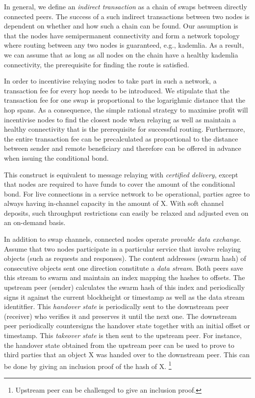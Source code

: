 \documentclass[a4paper,10pt]{article}
\newcommand\gloss[1]{\emph{\gls{#1}}}
\begin{document}
In general, we define an \emph{indirect transaction} as a chain of swaps between directly connected
peers. The success of a such indirect transactions between two nodes is dependent on whether and
how such a chain can be found. Our assumption is that the nodes have semipermanent connectivity
and form a network topology where routing between any two nodes is guaranteed, e.g., kademlia. As a result, we can assume that as long as all nodes on the chain have a healthy kademlia connectivity, the prerequisite for finding the route is satisfied.

In order to incentivise relaying nodes to take part in such a network,
a transaction fee for every hop needs to be introduced.  We stipulate that the transaction fee
for one swap is proportional to the logarighmic distance that the hop spans.
As a consequence, the simple rational strategy to maximise profit will incentivise nodes to find the
closest node when relaying as well as maintain a healthy connectivity that is the
prerequisite for successful routing.
Furthermore, the entire transaction fee can be precalculated as proportional
to the distance between sender and remote beneficiary and therefore can be offered in advance
when issuing the conditional bond.

This construct is
equivalent to message relaying with \gloss{certified delivery}, except that nodes are required to have
funds to cover the amount of the conditional bond.
For live connections in a service network to be operational,
parties agree to always having in-channel capacity in the amount of X.
With soft channel deposits, such throughput restrictions can easily
be relaxed and adjusted even on an on-demand basis.

In addition to swap channels, connected nodes operate \gloss{provable data exchange}.
Assume that two nodes participate in a particular service that involve
relaying objects (such as requests and responses).
The content addresses (swarm hash) of consecutive objects
sent one direction constitute a \emph{data stream}.
Both peers save this stream to swarm and maintain an index mapping the hashes to offsets.
The upstream peer (sender) calculates the swarm hash of this index and periodically
signs it against the current blockheight or timestamp as well as the data stream identitfier.
This \gloss{handover state} is periodically sent to the downstream peer (receiver)
who verifies it and preserves it until the next one.
The downstream peer periodically countersigns the handover state together with an initial
offset or timestamp. This \gloss{takeover state} is then sent to the upstream peer.
For instance, the handover state obtained from the upstream peer can be used to prove to third parties
that an object X was handed over to the downstream peer. This can be done by
giving an inclusion proof of the hash of X.%
%
\footnote{Upstream peer can be challenged to give an inclusion proof.}
\end{document}
